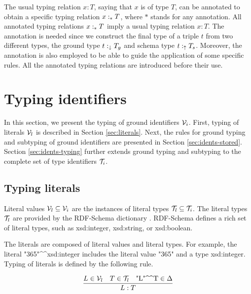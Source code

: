 \documentclass[runningheads]{llncs}
\newcommand{\darr}{\downarrow}
\newcommand{\uarr}{\uparrow}
\newcommand{\V}{{\cal V}}
\newcommand{\T}{{\cal T}}
\begin{document}
The usual typing relation $x:T$, saying that $x$ is of type $T$, can
be annotated to obtain a specific typing relation $x:_*\/T$, where $*$
stands for any annotation. All annotated typing relations $x:_*\/T$
imply a usual typing relation $x:T$. The annotation is needed since we
construct the final type of a triple $t$ from two different types, the
ground type $t:_\darr\/T_g$ and schema type $t:_\uarr\/T_s$. Moreover,
the annotation is also employed to be able to guide the application of
some specific rules. All the annotated typing relations are introduced
before their use.








\section{Typing identifiers\label{sec:typ-idents}}

In this section, we present the typing of ground identifiers
$\V_i$. First, typing of literals $\V_l$ is described in Section
\ref{sec:literals}. Next, the rules for ground typing and subtyping of
ground identifiers are presented in Section
\ref{sec:idents-stored}. Section \ref{sec:idents-typing} further
extends ground typing and subtyping to the complete set of type
identifiers $\T_i$.





\subsection{Typing literals\label{sec:literals}}

Literal values $\V_l\subseteq\V_i$ are the instances of literal types
$\T_l\subseteq\T_i$. The literal types $\T_l$ are provided by the
RDF-Schema dictionary \cite{rdfschema}. RDF-Schema defines a rich set
of literal types, such as xsd:integer, xsd:string, or xsd:boolean.

The literals are composed of literal values and literal types. For
example, the literal
"365"\textasciicircum\textasciicircum\/xsd:integer includes the
literal value "365" and a type xsd:integer. Typing of literals is
defined by the following rule.

\begin{equation}
\dfrac{L\in\V_l\quad T\in\T_l\quad \text{"L"\textasciicircum\textasciicircum\/T}\in\Delta}
      {L:T}  
\end{equation}
\end{document}
